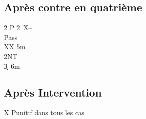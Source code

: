 \documentclass[a4paper]{article}
\begin{document}
\subsection{Après contre en quatrième}

\begin{bidtable}
2\h \> P 2\s\ X--\+\\
Pass \h \\
XX \s 5m\\
2NT\\
3\c\d {}\s\ 6m\-
\end{bidtable}

\subsection{Après Intervention}

X Punitif dans tous les cas
\end{document}
